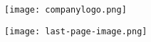 %
%
%
%

\clearpage
\thispagestyle{empty}

\begin{flushleft}
    \texttt{[image: companylogo.png]}
\end{flushleft}

\vspace{2.5cm}

\begin{flushright}
    \texttt{[image: last-page-image.png]}
\end{flushright}

\vspace{1.6cm}

